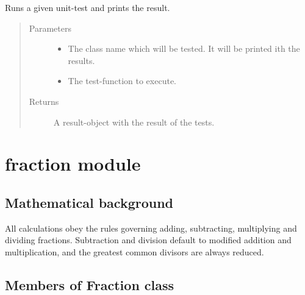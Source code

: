 \documentclass[letterpaper,10pt,english]{sphinxmanual}
\begin{document}
\begin{fulllineitems}
\label{\detokenize{bruch:bruch.run_test}}
Runs a given unit-test and prints the result.
\begin{quote}\begin{description}
\item[{Parameters}] \leavevmode\begin{itemize}
\item {} 
 \textendash{} The class name which will be tested. It will be printed ith the results.

\item {} 
 \textendash{} The test-function to execute.

\end{itemize}

\item[{Returns}] \leavevmode
A result-object with the result of the tests.

\end{description}\end{quote}

\end{fulllineitems}



\section{fraction module}
\label{\detokenize{fraction:fraction-module}}\label{\detokenize{fraction::doc}}

\subsection{Mathematical background}
\label{\detokenize{fraction:mathematical-background}}
All calculations obey the rules governing adding, subtracting, multiplying and dividing fractions.
Subtraction and division default to modified addition and multiplication, and the greatest common divisors are always reduced.


\subsection{Members of Fraction class}
\label{\detokenize{fraction:members-of-fraction-class}}\label{\detokenize{fraction:fraction-class}}\label{\detokenize{fraction:module-fraction}}
\end{document}
